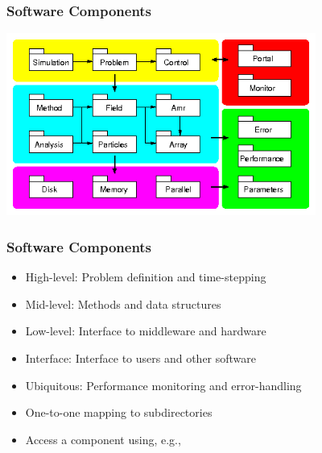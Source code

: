 \begin{frame}[fragile] \frametitle{Software Components}
\centerline{\includegraphics[width=4in]{components.png}}
\end{frame}
\begin{frame}[fragile] \frametitle{Software Components}
\begin{itemize}
\item \color{gray} High-level: Problem definition and time-stepping
\item \color{cyan} Mid-level: Methods and data structures
\item \color{magenta} Low-level: Interface to middleware and hardware
\item \color{red} Interface: Interface to users and other software
\item \color{green} Ubiquitous: Performance monitoring and error-handling
\end{itemize}
\begin{itemize}
\item One-to-one mapping to subdirectories
\item Access a component using, e.g., \textcolor<3>{blue}{}
\end{itemize}
\end{frame}